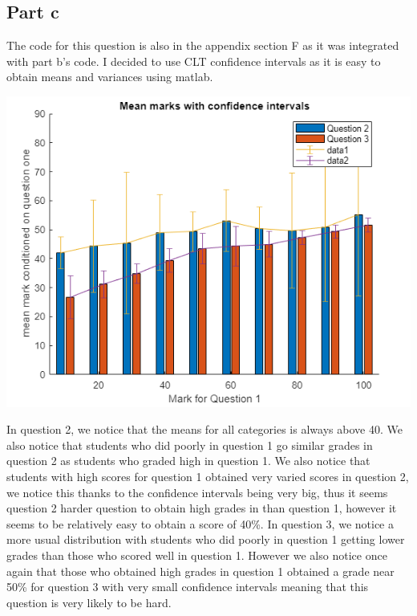 \documentclass[10pt]{article}
\begin{document}
\subsection*{Part c}
The code for this question is also in the appendix section F as it was integrated with part b's code.
I decided to use CLT confidence intervals as it is easy to obtain means and variances using matlab.
\begin{center}
    \includegraphics[scale=0.55]{final_c}
\end{center}
In question 2, we notice that the means for all categories is always above
40. We also notice that students who did poorly in question 1 go similar grades in question 2
as students who graded high in question 1. We also notice that students with high scores for question
1 obtained very varied scores in question 2, we notice this thanks to the confidence intervals being very big, 
thus it seems question 2 harder question to obtain high grades in than question 1, however it seems to be 
relatively easy to obtain a score of 40\%. 
In question 3, we notice a more usual distribution with students who did poorly in question 1 getting lower grades than
those who scored well in question 1. However we also notice once again that those who obtained high grades
in question 1 obtained a grade near 50\% for question 3 with very small confidence intervals meaning
that this question is very likely to be hard.
\end{document}
